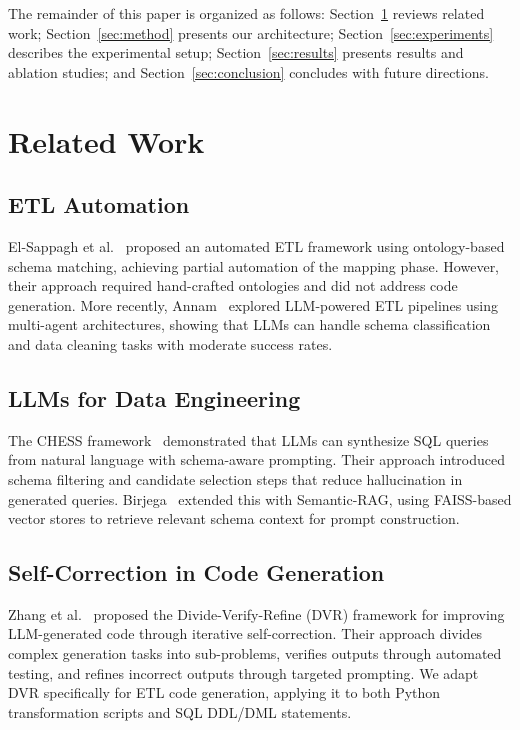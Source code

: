 \documentclass[conference]{IEEEtran}
\begin{document}
The remainder of this paper is organized as follows: Section~\ref{sec:related}
reviews related work; Section~\ref{sec:method} presents our architecture;
Section~\ref{sec:experiments} describes the experimental setup;
Section~\ref{sec:results} presents results and ablation studies; and
Section~\ref{sec:conclusion} concludes with future directions.

\section{Related Work}
\label{sec:related}

\subsection{ETL Automation}
El-Sappagh et al.~\cite{elsappagh2011} proposed an automated ETL framework
using ontology-based schema matching, achieving partial automation of the
mapping phase. However, their approach required hand-crafted ontologies and
did not address code generation. More recently, Annam~\cite{annam2025}
explored LLM-powered ETL pipelines using multi-agent architectures, showing
that LLMs can handle schema classification and data cleaning tasks with
moderate success rates.

\subsection{LLMs for Data Engineering}
The CHESS framework~\cite{talaei2024chess} demonstrated that LLMs can
synthesize SQL queries from natural language with schema-aware prompting.
Their approach introduced schema filtering and candidate selection steps
that reduce hallucination in generated queries. Birjega~\cite{birjega2025}
extended this with Semantic-RAG, using FAISS-based vector stores to retrieve
relevant schema context for prompt construction.

\subsection{Self-Correction in Code Generation}
Zhang et al.~\cite{zhang2024dvr} proposed the Divide-Verify-Refine (DVR)
framework for improving LLM-generated code through iterative self-correction.
Their approach divides complex generation tasks into sub-problems, verifies
outputs through automated testing, and refines incorrect outputs through
targeted prompting. We adapt DVR specifically for ETL code generation,
applying it to both Python transformation scripts and SQL DDL/DML statements.
\end{document}
